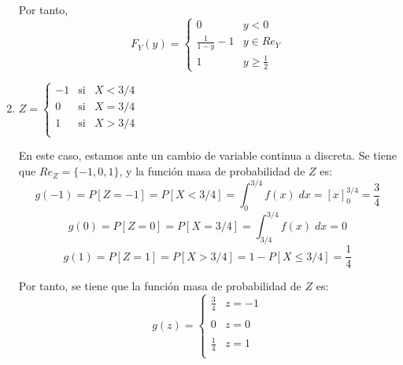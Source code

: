 \begin{ejercicio}
\begin{enumerate}
        Por tanto,
        \begin{equation*}
            F_Y(y)=\left\{\begin{array}{cc}
                0 & y<0 \\
                \frac{1}{1-y}-1 & y\in Re_Y \\
                1 & y\geq \frac{1}{2}
            \end{array}\right.
        \end{equation*}

        \item $\displaystyle Z=\left\{\begin{array}{ccc}
            -1 & \text{si} & X<3/4 \\
            0 & \text{si} & X=3/4 \\
            1 & \text{si} & X>3/4 \\
        \end{array}\right.$

        En este caso, estamos ante un cambio de variable continua a discreta. Se tiene que $Re_Z=\{-1,0,1\}$, y la función masa de probabilidad de $Z$ es:
        \begin{equation*}
            g(-1) = P[Z=-1]=P[X<3/4] = \int_0^{3/4}f(x)\;dx = \left[x\right]_0^{3/4} = \frac{3}{4}
        \end{equation*}
        \begin{equation*}
            g(0) = P[Z=0]=P[X=3/4] = \int_{3/4}^{3/4}f(x)\;dx = 0
        \end{equation*}
        \begin{equation*}
            g(1) = P[Z=1]=P[X>3/4] = 1-P[X\leq 3/4] = \frac{1}{4}
        \end{equation*}

        Por tanto, se tiene que la función masa de probabilidad de $Z$ es:
        \begin{equation*}
            g(z)=\left\{\begin{array}{cl}
                \displaystyle  \frac{3}{4} & z=-1 \\ \\
                0 & z=0\\ \\
                \displaystyle  \frac{1}{4} & z=1 \\
            \end{array}\right.
        \end{equation*}


\end{enumerate}
\end{ejercicio}
